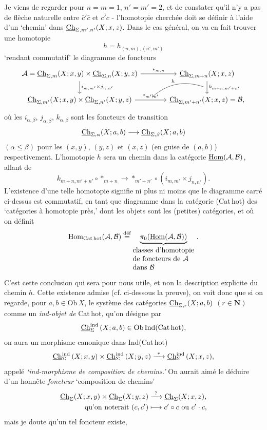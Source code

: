 Je viens de regarder pour $n=m=1$, $n'=m'=2$, et de constater qu'il n'y a pas de flèche naturelle entre $\bar{c}'\bar{c}$ et $\overline{c'c}$ - l'homotopie cherchée doit
se définir à l'aide d'un `chemin' dans $\underline{\mathrm{Ch}}_{\Sigma,m',n'}(X;x,z)$. Dans le cas général, on va en fait trouver une homotopie
\[
h=h_{(n,m),(n',m')}
\]
`rendant commutatif' le diagramme de foncteurs
\[
\begin{tikzcd}[column sep=large]
\mathcal{A}=\uCh_{\Sigma,m}(X;x,y)\times\uCh_{\Sigma,n}(X;y,z) \arrow[r, "*_{m,n}"] \arrow[d, "i_{m,m'}\times j_{n,n'}"] & \uCh_{\Sigma,m+n}(X;x,z) \arrow[d, "k_{m+n,m'+n'}", ""'{name=K}] \\
\uCh_{\Sigma,m'}(X;x,y)\times\uCh_{\Sigma,n'}(X;y,z) \arrow[r, "*_{m',n'}", ""{name=S}] & \uCh_{\Sigma,m'+n'}(X;x,z)=\mathcal{B},
\arrow[from=K, to=S, bend right, "h"']
\end{tikzcd}
\]
où les $i_{\alpha,\beta}$, $j_{\alpha,\beta}$, $k_{\alpha,\beta}$ sont les foncteurs de transition
\[
\underline{\mathrm{Ch}}_{\Sigma,\alpha}(X;a,b)\longrightarrow\underline{\mathrm{Ch}}_{\Sigma,\beta}(X;a,b)
\]
$(\alpha\leq\beta)$ pour les $(x,y)$, $(y,z)$ et $(x,z)$ (en guise de $(a,b)$) respectivement. L'homotopie $h$ sera un chemin dans la catégorie $\underline{\mathrm{Hom}}(\mathcal{A},\mathcal{B})$, allant de
\[
k_{m+n,m'+n'}\circ{*}_{m+n}\longrightarrow{*}_{m'+n'}\circ(i_{m,m'}\times j_{n,n'}).
\]
L'existence d'une telle homotopie signifie ni plus ni moins que le diagramme carré ci-dessus est commutatif, en tant que diagramme dans la catégorie (Cat\,hot) des `catégories à homotopie près,' dont les objets sont
les (petites) catégories, et où on définit
\[
\Hom_{\mathrm{Cat\,hot}}(\mathcal{A},\mathcal{B})\overset{\text{déf}}{=}\underbrace{\pi_0(\uHom(\mathcal{A},\mathcal{B}))}_{\begin{array}{@{}l@{}}\text{classes d'homotopie}\\ \text{de foncteurs de }\mathcal{A}\\ \text{dans }\mathcal{B}\end{array}}\,.
\]
C'est cette conclusion qui sera pour nous utile, et non la description explicite du chemin $h$. Cette existence admise (cf. ci-dessous la preuve), on voit donc que si on regarde, pour $a,b\in\mathrm{Ob}\,X$, le système des catégories $\underline{\mathrm{Ch}}_{\Sigma,r}(X;a,b)$ $(r\in\mathbf{N})$ comme un \textit{ind-objet de} Cat\,hot\textit{,} qu'on désigne par
\[
\underline{\mathrm{Ch}}^{\mathrm{ind}}_{\Sigma}\,(X;a,b)\in\mathrm{Ob}\,\mathrm{Ind}(\mathrm{Cat\,hot}),
\]
on aura un morphisme canonique dans Ind(Cat\,hot)
\[
\uCh^{\mathrm{ind}}_{\Sigma}\,(X;x,y)\times\uCh^{\mathrm{ind}}_{\Sigma}\,(X;y,z)\xrightarrow{\ *\ }\uCh^{\mathrm{ind}}_{\Sigma}\,(X;x,z),
\]
appelé \textit{`ind-morphisme de composition de chemins.'} On aurait aimé le déduire d'un honnête \textit{foncteur} `composition de chemins'
\[
\begin{aligned}
\underline{\mathrm{Ch}}_\Sigma(X;x,y)\times\underline{\mathrm{Ch}}_\Sigma(X;y,z) &\xrightarrow{\ ?\ } \underline{\mathrm{Ch}}_\Sigma(X;x,z),\\
\text{qu'on noterait }(c,c') &\longmapsto c'\circ c\text{ ou }c'\cdot c,
\end{aligned}
\]
mais je doute qu'un tel foncteur existe,

